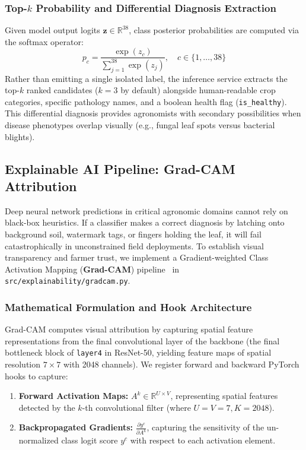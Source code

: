 \subsubsection{Top-$k$ Probability and Differential Diagnosis Extraction}
Given model output logits $\mathbf{z} \in \mathbb{R}^{38}$, class posterior probabilities are computed via the softmax operator:
\begin{equation}
    p_c = \frac{\exp(z_c)}{\sum_{j=1}^{38} \exp(z_j)}, \quad c \in \{1, \dots, 38\}
\end{equation}
Rather than emitting a single isolated label, the inference service extracts the top-$k$ ranked candidates ($k=3$ by default) alongside human-readable crop categories, specific pathology names, and a boolean health flag (\texttt{is\_healthy}). This differential diagnosis provides agronomists with secondary possibilities when disease phenotypes overlap visually (e.g., fungal leaf spots versus bacterial blights).

\subsection{Explainable AI Pipeline: Grad-CAM Attribution}
\label{subsec:gradcam_pipeline}
Deep neural network predictions in critical agronomic domains cannot rely on black-box heuristics. If a classifier makes a correct diagnosis by latching onto background soil, watermark tags, or fingers holding the leaf, it will fail catastrophically in unconstrained field deployments. To establish visual transparency and farmer trust, we implement a Gradient-weighted Class Activation Mapping (\textbf{Grad-CAM}) pipeline~\cite{gradcam} in \texttt{src/explainability/gradcam.py}.

\subsubsection{Mathematical Formulation and Hook Architecture}
Grad-CAM computes visual attribution by capturing spatial feature representations from the final convolutional layer of the backbone (the final bottleneck block of \texttt{layer4} in ResNet-50, yielding feature maps of spatial resolution $7 \times 7$ with 2048 channels). We register forward and backward PyTorch hooks to capture:
\begin{enumerate}[leftmargin=*]
    \item \textbf{Forward Activation Maps:} $A^k \in \mathbb{R}^{U \times V}$, representing spatial features detected by the $k$-th convolutional filter (where $U=V=7, K=2048$).
    \item \textbf{Backpropagated Gradients:} $\frac{\partial y^c}{\partial A^k}$, capturing the sensitivity of the un-normalized class logit score $y^c$ with respect to each activation element.
\end{enumerate}

